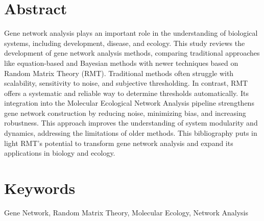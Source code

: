 \documentclass[leqno]{article}[12pt]
\begin{document}
\newpage
{}
\printbibliography

\newpage

\section*{Abstract}\label{sec:abstract}
Gene network analysis plays an important role in the understanding of biological systems, including development, disease, and ecology.
This study reviews the development of gene network analysis methods, comparing traditional approaches like equation-based and Bayesian methods with newer techniques based on Random Matrix Theory (RMT). Traditional methods often struggle with scalability, sensitivity to noise, and subjective thresholding.
In contrast, RMT offers a systematic and reliable way to determine thresholds automatically.
Its integration into the Molecular Ecological Network Analysis pipeline strengthens gene network construction by reducing noise, minimizing bias, and increasing robustness.
This approach improves the understanding of system modularity and dynamics, addressing the limitations of older methods.
This bibliography puts in light RMT's potential to transform gene network analysis and expand its applications in biology and ecology.


\vfill %

\section*{Keywords}
\noindent Gene Network, Random Matrix Theory, Molecular Ecology, Network Analysis
\thispagestyle{firstpagestyle}
\end{document}
